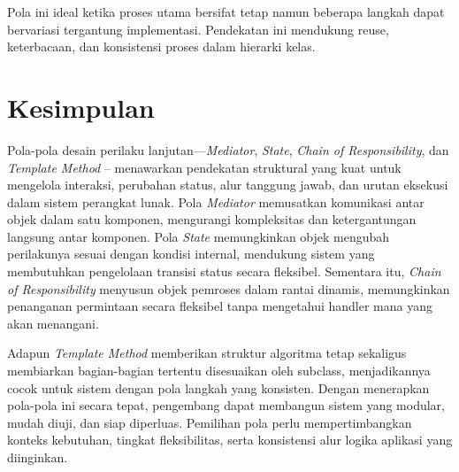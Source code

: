 Pola ini ideal ketika proses utama bersifat tetap namun beberapa langkah dapat bervariasi tergantung implementasi. Pendekatan ini mendukung reuse, keterbacaan, dan konsistensi proses dalam hierarki kelas.

\section{Kesimpulan}

Pola-pola desain perilaku lanjutan—\textit{Mediator}, \textit{State}, \textit{Chain of Responsibility}, dan \textit{Template Method} -- menawarkan pendekatan struktural yang kuat untuk mengelola interaksi, perubahan status, alur tanggung jawab, dan urutan eksekusi dalam sistem perangkat lunak. Pola \textit{Mediator} memusatkan komunikasi antar objek dalam satu komponen, mengurangi kompleksitas dan ketergantungan langsung antar komponen. Pola \textit{State} memungkinkan objek mengubah perilakunya sesuai dengan kondisi internal, mendukung sistem yang membutuhkan pengelolaan transisi status secara fleksibel. Sementara itu, \textit{Chain of Responsibility} menyusun objek pemroses dalam rantai dinamis, memungkinkan penanganan permintaan secara fleksibel tanpa mengetahui handler mana yang akan menangani. 

Adapun \textit{Template Method} memberikan struktur algoritma tetap sekaligus membiarkan bagian-bagian tertentu disesuaikan oleh subclass, menjadikannya cocok untuk sistem dengan pola langkah yang konsisten. Dengan menerapkan pola-pola ini secara tepat, pengembang dapat membangun sistem yang modular, mudah diuji, dan siap diperluas. Pemilihan pola perlu mempertimbangkan konteks kebutuhan, tingkat fleksibilitas, serta konsistensi alur logika aplikasi yang diinginkan.


